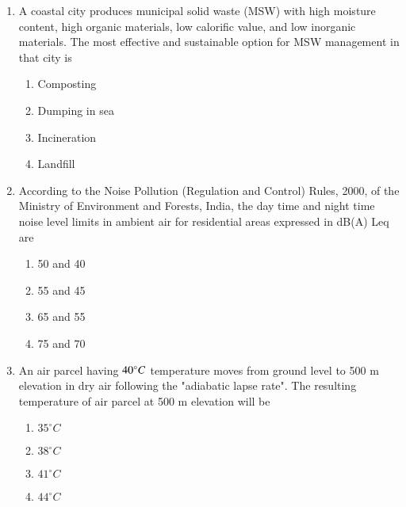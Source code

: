 \documentclass[journal]{IEEEtran}
\begin{document}
\begin{enumerate}
    \item A coastal city produces municipal solid waste (MSW) with high moisture
    content, high organic materials, low calorific value, and low inorganic materials.
    The most effective and sustainable option for MSW management in that city is  

        \begin{multicols}{4}
            \begin{enumerate}
                \item Composting
                \item Dumping in sea
                \item Incineration
                \item Landfill
            \end{enumerate}
        \end{multicols}

    \item According to the Noise Pollution (Regulation and Control) Rules, 2000,
    of the Ministry of Environment and Forests, India, the day time and night time
    noise level limits in ambient air for residential areas expressed in dB(A) Leq are
        \begin{multicols}{4}
            \begin{enumerate}
                \item 50 and 40
                \item 55 and 45
                \item 65 and 55
                \item 75 and 70
            \end{enumerate}
        \end{multicols}

        \item An air parcel having $40\degree C$ temperature moves from ground level to
        500 m elevation in dry air following the "adiabatic lapse rate". The resulting  
        temperature of air parcel at 500 m elevation will be
        \begin{multicols}{4}
            \begin{enumerate}
                \item $35^{\circ}C$
                \item $38^{\circ}C$
                \item $41^{\circ}C$
                \item $44^{\circ}C$
            \end{enumerate}
        \end{multicols}


\end{enumerate}
\end{document}
